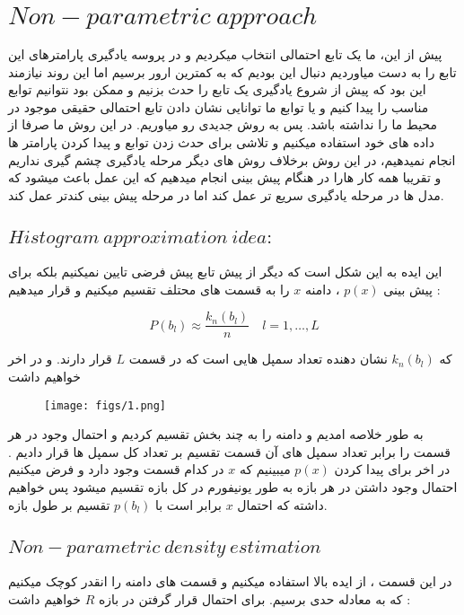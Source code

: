 \documentclass[12pt]{article}
\begin{document}
\fontsize{12pt}{14pt}\selectfont




\section{$Non-parametric\:approach$}
پیش از این، ما یک تابع احتمالی انتخاب میکردیم و در پروسه یادگیری پارامترهای این تابع را به دست میاوردیم دنبال این بودیم که به کمترین ارور برسیم اما این روند نیازمند این بود که پیش از شروع یادگیری یک تابع را حدث بزنیم  و ممکن بود نتوانیم توابع مناسب را پیدا کنیم و یا توابع ما توانایی نشان دادن تابع احتمالی حقیقی موجود در محیط ما را نداشته باشد. پس به روش جدیدی رو میاوریم. در این روش ما صرفا از داده های خود استفاده میکنیم و تلاشی برای حدث زدن توابع و پیدا کردن پارامتر ها انجام نمیدهیم، در این روش برخلاف روش های دیگر مرحله یادگیری چشم گیری نداریم و تقریبا همه کار هارا در هنگام پیش بینی انجام میدهیم که این عمل باعث میشود که مدل ها در مرحله یادگیری سریع تر عمل کند اما در مرحله پیش بینی کندتر عمل کند.

\subsection{$Histogram\:approximation\:idea:$}
این ایده به این شکل است که دیگر از پیش تابع پیش فرضی تایین نمیکنیم بلکه برای پیش بینی $p(x)$ ، دامنه $x$ را به قسمت های محتلف تقسیم میکنیم و قرار میدهیم :

\[
P(b_l) \approx \frac{k_n(b_l)}{n} \quad l = 1, \ldots, L
\]

که $k_n(b_l)$ نشان دهنده تعداد سمپل هایی است که در قسمت $L$ قرار دارند.
و در اخر خواهیم داشت 

\begin{figure}[h]
    \centering
    \texttt{[image: figs/1.png]}
    \label{fig:sample}
\end{figure}

به طور خلاصه امدیم و دامنه را به چند بخش تقسیم کردیم و احتمال وجود در هر قسمت را برابر تعداد سمپل های آن قسمت تقسیم بر تعداد کل سمپل ها قرار دادیم . در اخر برای پیدا کردن $p(x)$ میبینیم که $x$ در کدام قسمت وجود دارد و فرض میکنیم احتمال وجود داشتن در هر بازه به طور یونیفورم در کل بازه تقسیم میشود پس خواهیم داشته که احتمال $x$ برابر است با $p(b_l)$ تقسیم بر طول بازه. 

\subsection{$Non-parametric\:density\:estimation$}
در این قسمت ، از ایده بالا استفاده میکنیم و قسمت های دامنه را انقدر کوچک میکنیم که به معادله حدی برسیم. برای احتمال قرار گرفتن در بازه $R$ خواهیم داشت : 
\end{document}
